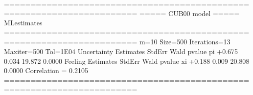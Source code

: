 \documentclass[letterpaper,10pt,english]{sphinxmanual}
\begin{document}
\begin{sphinxVerbatim}[commandchars=\\\{\}]
=======================================================================
=====\PYGZgt{}\PYGZgt{}\PYGZgt{} CUB00 model \PYGZlt{}\PYGZlt{}\PYGZlt{}===== ML\PYGZhy{}estimates
=======================================================================
m=10  Size=500  Iterations=13  Maxiter=500  Tol=1E\PYGZhy{}04
\PYGZhy{}\PYGZhy{}\PYGZhy{}\PYGZhy{}\PYGZhy{}\PYGZhy{}\PYGZhy{}\PYGZhy{}\PYGZhy{}\PYGZhy{}\PYGZhy{}\PYGZhy{}\PYGZhy{}\PYGZhy{}\PYGZhy{}\PYGZhy{}\PYGZhy{}\PYGZhy{}\PYGZhy{}\PYGZhy{}\PYGZhy{}\PYGZhy{}\PYGZhy{}\PYGZhy{}\PYGZhy{}\PYGZhy{}\PYGZhy{}\PYGZhy{}\PYGZhy{}\PYGZhy{}\PYGZhy{}\PYGZhy{}\PYGZhy{}\PYGZhy{}\PYGZhy{}\PYGZhy{}\PYGZhy{}\PYGZhy{}\PYGZhy{}\PYGZhy{}\PYGZhy{}\PYGZhy{}\PYGZhy{}\PYGZhy{}\PYGZhy{}\PYGZhy{}\PYGZhy{}\PYGZhy{}\PYGZhy{}\PYGZhy{}\PYGZhy{}\PYGZhy{}\PYGZhy{}\PYGZhy{}\PYGZhy{}\PYGZhy{}\PYGZhy{}\PYGZhy{}\PYGZhy{}\PYGZhy{}\PYGZhy{}\PYGZhy{}\PYGZhy{}\PYGZhy{}\PYGZhy{}\PYGZhy{}\PYGZhy{}\PYGZhy{}\PYGZhy{}\PYGZhy{}\PYGZhy{}
Uncertainty
Estimates  StdErr    Wald  p\PYGZhy{}value
pi     +0.675   0.034  19.872   0.0000
\PYGZhy{}\PYGZhy{}\PYGZhy{}\PYGZhy{}\PYGZhy{}\PYGZhy{}\PYGZhy{}\PYGZhy{}\PYGZhy{}\PYGZhy{}\PYGZhy{}\PYGZhy{}\PYGZhy{}\PYGZhy{}\PYGZhy{}\PYGZhy{}\PYGZhy{}\PYGZhy{}\PYGZhy{}\PYGZhy{}\PYGZhy{}\PYGZhy{}\PYGZhy{}\PYGZhy{}\PYGZhy{}\PYGZhy{}\PYGZhy{}\PYGZhy{}\PYGZhy{}\PYGZhy{}\PYGZhy{}\PYGZhy{}\PYGZhy{}\PYGZhy{}\PYGZhy{}\PYGZhy{}\PYGZhy{}\PYGZhy{}\PYGZhy{}\PYGZhy{}\PYGZhy{}\PYGZhy{}\PYGZhy{}\PYGZhy{}\PYGZhy{}\PYGZhy{}\PYGZhy{}\PYGZhy{}\PYGZhy{}\PYGZhy{}\PYGZhy{}\PYGZhy{}\PYGZhy{}\PYGZhy{}\PYGZhy{}\PYGZhy{}\PYGZhy{}\PYGZhy{}\PYGZhy{}\PYGZhy{}\PYGZhy{}\PYGZhy{}\PYGZhy{}\PYGZhy{}\PYGZhy{}\PYGZhy{}\PYGZhy{}\PYGZhy{}\PYGZhy{}\PYGZhy{}\PYGZhy{}
Feeling
Estimates  StdErr    Wald  p\PYGZhy{}value
xi     +0.188   0.009  20.808   0.0000
\PYGZhy{}\PYGZhy{}\PYGZhy{}\PYGZhy{}\PYGZhy{}\PYGZhy{}\PYGZhy{}\PYGZhy{}\PYGZhy{}\PYGZhy{}\PYGZhy{}\PYGZhy{}\PYGZhy{}\PYGZhy{}\PYGZhy{}\PYGZhy{}\PYGZhy{}\PYGZhy{}\PYGZhy{}\PYGZhy{}\PYGZhy{}\PYGZhy{}\PYGZhy{}\PYGZhy{}\PYGZhy{}\PYGZhy{}\PYGZhy{}\PYGZhy{}\PYGZhy{}\PYGZhy{}\PYGZhy{}\PYGZhy{}\PYGZhy{}\PYGZhy{}\PYGZhy{}\PYGZhy{}\PYGZhy{}\PYGZhy{}\PYGZhy{}\PYGZhy{}\PYGZhy{}\PYGZhy{}\PYGZhy{}\PYGZhy{}\PYGZhy{}\PYGZhy{}\PYGZhy{}\PYGZhy{}\PYGZhy{}\PYGZhy{}\PYGZhy{}\PYGZhy{}\PYGZhy{}\PYGZhy{}\PYGZhy{}\PYGZhy{}\PYGZhy{}\PYGZhy{}\PYGZhy{}\PYGZhy{}\PYGZhy{}\PYGZhy{}\PYGZhy{}\PYGZhy{}\PYGZhy{}\PYGZhy{}\PYGZhy{}\PYGZhy{}\PYGZhy{}\PYGZhy{}\PYGZhy{}
Correlation   = 0.2105
=======================================================================

\end{sphinxVerbatim}
\end{document}
